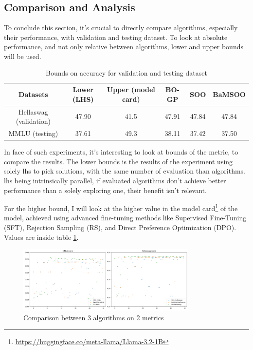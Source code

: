 
\subsection{Comparison and Analysis}
\label{sec:comparison}

To conclude this section, it's crucial to directly compare algorithms, especially their performance, with validation and testing dataset. To look at absolute performance, and not only relative between algorithms, lower and upper bounds will be used. 

\begin{table}[h!]
    \centering
    \begin{tabular}{|c||c|c||c|c|c|}
    \hline
       Datasets  & Lower (LHS) & Upper (model card) & BO-GP & SOO & BaMSOO \\
    \hline
       Hellaswag (validation)  & 47.90 & 41.5 & 47.91 & 47.84 & 47.84\\
       MMLU (testing) & 37.61 & 49.3 & 38.11 & 37.42 & 37.50 \\
    \hline
    \end{tabular}
    \caption{Bounds on accuracy for validation and testing dataset}
    \label{tab:bounds}
\end{table}
In face of such experiments, it's interesting to look at bounds of the metric, to compare the results. The lower bounds is the results of the experiment using solely \acrshort{lhs} to pick solutions, with the same number of evaluation than algorithms. \acrshort{lhs} being intrinsically parallel, if evaluated algorithms don't achieve better performance than a solely exploring one, their benefit isn't relevant. 

For the higher bound, I will look at the higher value in the model card\footnote{\url{https://huggingface.co/meta-llama/Llama-3.2-1B}} of the model, achieved using advanced fine-tuning methods like Supervised Fine-Tuning (SFT), Rejection Sampling (RS), and Direct Preference Optimization (DPO). Values are inside table \ref{tab:bounds}.

\begin{figure}[h]
    \centering
    \includegraphics[width=0.8\textwidth]{figures/global/comparison.png}
    \caption{Comparison between 3 algorithms on 2 metrics}
    \label{fig:global_compare}
\end{figure}


